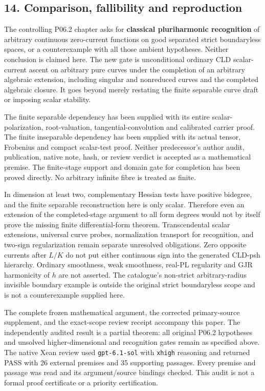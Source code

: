 \documentclass[
  11pt,
]{article}
\begin{document}
\subsection{14. Comparison, fallibility and
reproduction}\label{comparison-fallibility-and-reproduction}

The controlling P06.2 chapter asks for \textbf{classical pluriharmonic
recognition} of arbitrary continuous zero-current functions on good
separated strict boundaryless spaces, or a counterexample with all those
ambient hypotheses. Neither conclusion is claimed here. The new gate is
unconditional ordinary CLD scalar-current ascent on arbitrary pure
curves under the completion of an arbitrary algebraic extension,
including singular and nonreduced curves and the completed algebraic
closure. It goes beyond merely restating the finite separable curve
draft or imposing scalar stability.

The finite separable dependency has been supplied with its entire
scalar-polarization, root-valuation, tangential-convolution and
calibrated carrier proof. The finite inseparable dependency has been
supplied with its actual tensor, Frobenius and compact scalar-test
proof. Neither predecessor's author audit, publication, native note,
hash, or review verdict is accepted as a mathematical premise. The
finite-stage support and domain gate for completion has been proved
directly. No arbitrary infinite fibre is treated as finite.

In dimension at least two, complementary Hessian tests have positive
bidegree, and the finite separable reconstruction here is only scalar.
Therefore even an extension of the completed-stage argument to all form
degrees would not by itself prove the missing finite differential-form
theorem. Transcendental scalar extensions, universal curve probes,
normalization transport for recognition, and two-sign regularization
remain separate unresolved obligations. Zero opposite currents after
\(L/K\) do not put either continuous sign into the generated CLD-psh
hierarchy. Ordinary smoothness, weak smoothness, real-PL regularity and
GJR harmonicity of \(h\) are not asserted. The catalogue's non-strict
arbitrary-radius invisible boundary example is outside the original
strict boundaryless scope and is not a counterexample supplied here.

The complete frozen mathematical argument, the corrected primary-source
supplement, and the exact-scope review receipt accompany this paper.
The independently audited result is a partial theorem: all original
P06.2 hypotheses and unsolved higher-dimensional and recognition gates
remain as specified above. The native Xean review used
\texttt{gpt-6.1-sol} with \texttt{xhigh} reasoning and returned PASS with
26 external premises and 35 supporting passages. Every premise and
passage was read and its argument/source bindings checked. This audit
is not a formal proof certificate or a priority certification.
\end{document}
